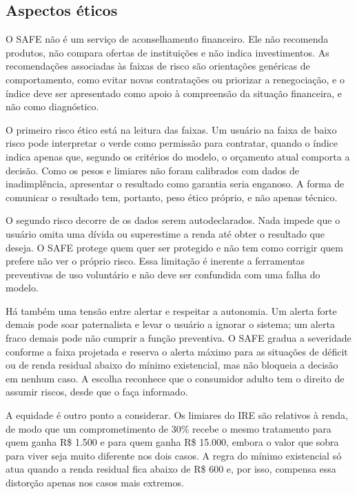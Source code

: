 \documentclass[portuguese]{sbc2025}%
\begin{document}
\subsection{Aspectos éticos}

O SAFE não é um serviço de aconselhamento financeiro. Ele não recomenda produtos, não compara ofertas de instituições e não indica investimentos. As recomendações associadas às faixas de risco são orientações genéricas de comportamento, como evitar novas contratações ou priorizar a renegociação, e o índice deve ser apresentado como apoio à compreensão da situação financeira, e não como diagnóstico.

O primeiro risco ético está na leitura das faixas. Um usuário na faixa de baixo risco pode interpretar o verde como permissão para contratar, quando o índice indica apenas que, segundo os critérios do modelo, o orçamento atual comporta a decisão. Como os pesos e limiares não foram calibrados com dados de inadimplência, apresentar o resultado como garantia seria enganoso. A forma de comunicar o resultado tem, portanto, peso ético próprio, e não apenas técnico.

O segundo risco decorre de os dados serem autodeclarados. Nada impede que o usuário omita uma dívida ou superestime a renda até obter o resultado que deseja. O SAFE protege quem quer ser protegido e não tem como corrigir quem prefere não ver o próprio risco. Essa limitação é inerente a ferramentas preventivas de uso voluntário e não deve ser confundida com uma falha do modelo.

Há também uma tensão entre alertar e respeitar a autonomia. Um alerta forte demais pode soar paternalista e levar o usuário a ignorar o sistema; um alerta fraco demais pode não cumprir a função preventiva. O SAFE gradua a severidade conforme a faixa projetada e reserva o alerta máximo para as situações de déficit ou de renda residual abaixo do mínimo existencial, mas não bloqueia a decisão em nenhum caso. A escolha reconhece que o consumidor adulto tem o direito de assumir riscos, desde que o faça informado.

A equidade é outro ponto a considerar. Os limiares do IRE são relativos à renda, de modo que um comprometimento de 30\% recebe o mesmo tratamento para quem ganha R\$ 1.500 e para quem ganha R\$ 15.000, embora o valor que sobra para viver seja muito diferente nos dois casos. A regra do mínimo existencial só atua quando a renda residual fica abaixo de R\$ 600 e, por isso, compensa essa distorção apenas nos casos mais extremos.
\end{document}
